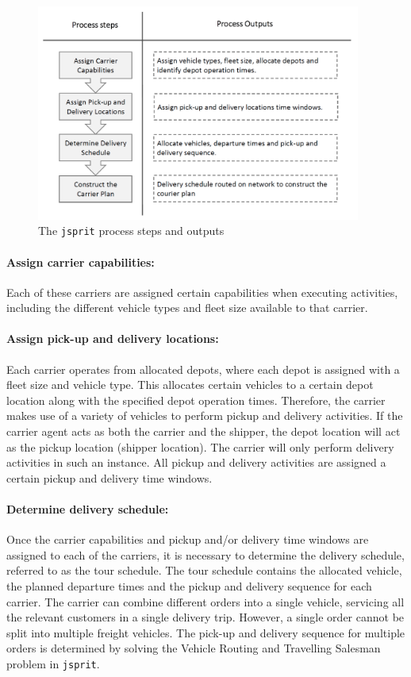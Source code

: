 \begin{figure}[h]
    \centering
    \includegraphics[width=0.95\textwidth]{images/jsprit_process.PNG}
    \caption{The \texttt{jsprit} process steps and outputs}
    \label{fig:jsprit}
\end{figure}


\paragraph{Assign carrier capabilities:} Each of these carriers are assigned certain capabilities when executing activities, including the different vehicle types and fleet size available to that carrier. 

\paragraph{Assign pick-up and delivery locations:} Each carrier operates from allocated depots, where each depot is assigned with a fleet size and vehicle type. This allocates certain vehicles to a certain depot location along with the specified depot operation times. Therefore, the carrier makes use of a variety of vehicles to perform pickup and delivery activities. If the carrier agent acts as both the carrier and the shipper, the depot location will act as the pickup location (shipper location). The carrier will only perform delivery activities in such an instance. All pickup and delivery activities are assigned a certain pickup and delivery time windows.

\paragraph{Determine delivery schedule:} Once the carrier capabilities and pickup and/or delivery time windows are assigned to each of the carriers, it is necessary to determine the delivery schedule, referred to as the tour schedule. The tour schedule contains the allocated vehicle, the planned departure times and the pickup and delivery sequence for each carrier. The carrier can combine different orders into a single vehicle, servicing all the relevant customers in a single delivery trip. However, a single order cannot be split into multiple freight vehicles. The pick-up and delivery sequence for multiple orders is determined by solving the Vehicle Routing and Travelling Salesman problem in \texttt{jsprit}. 

